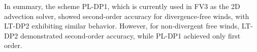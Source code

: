 In summary, the scheme PL-DP1, which is currently used in FV3 as the 2D advection solver, 
showed second-order accuracy for divergence-free winds, with LT-DP2 exhibiting similar behavior. 
However, for non-divergent free winds, LT-DP2 demonstrated second-order accuracy, while PL-DP1 achieved only first order.
